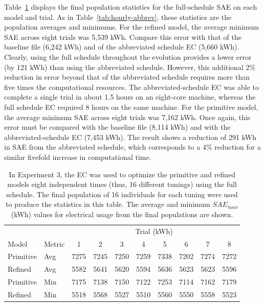 \documentclass[preprint, review, 12pt]{elsarticle}
\begin{document}
Table~\ref{tab:hourly-full} displays the final population statistics for the full-schedule SAE on each model and trial. As in Table~\ref{tab:hourly-abbrev}, these statistics are the population averages and minimums. For the refined model, the average minimum SAE across eight trials was 5,539 kWh. Compare this error with that of the baseline file (6,242 kWh) and of the abbreviated schedule EC (5,660 kWh). Clearly, using the full schedule throughout the evolution provides a lower error (by 121 kWh) than using the abbreviated schedule. However, this additional 2\% reduction in error beyond that of the abbreviated schedule requires more than five times the computational resources. The abbreviated-schedule EC was able to complete a single trial in about 1.5 hours on an eight-core machine, whereas the full schedule EC required 8 hours on the same machine. For the primitive model, the average minimum SAE across eight trials was 7,162 kWh. Once again, this error must be compared with the baseline file (8,114 kWh) and with the abbreviated-schedule EC (7,453 kWh). The result shows a reduction of 291 kWh in SAE from the abbreviated schedule, which corresponds to a 4\% reduction for a similar fivefold increase in computational time.

\begin{table}[htbp]
\centering
\caption{In Experiment 3, the EC was used to optimize the primitive and refined models eight independent times (thus, 16 different tunings) using the full schedule. The final population of 16 individuals for each tuning were used to produce the statistics in this table. The average and minimum $SAE_{hour}$ (kWh) values for electrical usage from the final populations are shown.}
\label{tab:hourly-full}
\begin{tabular}{llcccccccc}
\toprule
 &  & \multicolumn{8}{c}{Trial (kWh)}\\
Model & Metric & 1 & 2 & 3 & 4 & 5 & 6 & 7 & 8\\
\midrule
Primitive & Avg & 7275 & 7245 & 7250 & 7259 & 7338 & 7202 & 7274 & 7272\\\rowcolor{DarkRow}
Refined   & Avg & 5582 & 5641 & 5620 & 5594 & 5636 & 5623 & 5623 & 5596\\
Primitive & Min & 7175 & 7138 & 7150 & 7122 & 7253 & 7114 & 7162 & 7179\\\rowcolor{DarkRow}
Refined   & Min & 5518 & 5568 & 5527 & 5510 & 5560 & 5550 & 5558 & 5523\\
\bottomrule
\end{tabular}
\end{table}
\end{document}
